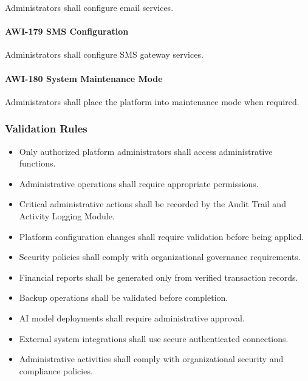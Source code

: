 Administrators shall configure email services.

\paragraph{AWI-179 SMS Configuration}

Administrators shall configure SMS gateway services.

\paragraph{AWI-180 System Maintenance Mode}

Administrators shall place the platform into maintenance mode when
required.


\subsubsection*{Validation Rules}

\begin{itemize}

\item Only authorized platform administrators shall access
administrative functions.

\item Administrative operations shall require appropriate permissions.

\item Critical administrative actions shall be recorded by the Audit
Trail and Activity Logging Module.

\item Platform configuration changes shall require validation before
being applied.

\item Security policies shall comply with organizational governance
requirements.

\item Financial reports shall be generated only from verified
transaction records.

\item Backup operations shall be validated before completion.

\item AI model deployments shall require administrative approval.

\item External system integrations shall use secure authenticated
connections.

\item Administrative activities shall comply with organizational
security and compliance policies.

\end{itemize}

